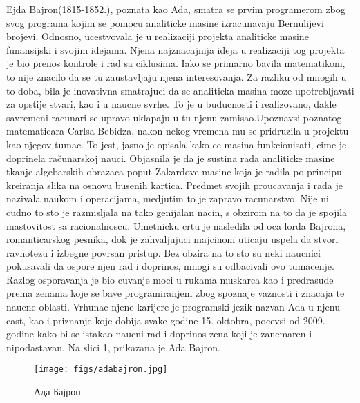 \documentclass[a4paper,12pt]{article}
\begin{document}
\begin{flushleft}
    Ejda Bajron(1815-1852.), poznata kao Ada, smatra se prvim programerom zbog svog programa kojim se pomocu analiticke masine izracunavaju Bernulijevi brojevi. Odnosno, ucestvovala je u realizaciji projekta analiticke masine funansijski i svojim idejama. Njena najznacajnija ideja u realizaciji tog projekta je bio prenos kontrole i rad sa ciklusima. Iako se primarno bavila matematikom, to nije znacilo da se tu zaustavljaju njena interesovanja. Za razliku od mnogih u to doba, bila je inovativna smatrajuci da se analiticka masina moze upotrebljavati za opstije stvari, kao i u naucne svrhe. To je u buducnosti i realizovano, dakle savremeni racunari se upravo uklapaju u tu njenu zamisao.Upoznavsi poznatog matematicara Carlsa Bebidza, nakon nekog vremena mu se pridruzila u projektu kao njegov tumac. To jest, jasno je opisala kako ce masina funkcionisati, cime je doprinela računarskoj nauci. Objasnila je da je sustina rada analiticke masine tkanje algebarskih obrazaca poput Zakardove masine koja je radila po principu kreiranja slika na osnovu busenih kartica. Predmet svojih proucavanja i rada je nazivala naukom i operacijama, medjutim to je zapravo racunarstvo. Nije ni cudno to sto je razmisljala na tako genijalan nacin, s obzirom na to da je spojila mastovitost sa racionalnoscu. Umetnicku crtu je nasledila od oca lorda Bajrona, romanticarskog pesnika, dok je zahvaljujuci majcinom uticaju uspela da stvori ravnotezu i izbegne povrsan pristup. Bez obzira na to sto su neki naucnici pokusavali da ospore njen rad i doprinos, mnogi su odbacivali ovo tumacenje. Razlog osporavanja je bio cuvanje moci u rukama muskarca kao i predrasude prema zenama koje se bave programiranjem zbog spoznaje vaznosti i znacaja te naucne oblasti. Vrhunac njene karijere je programski jezik nazvan Ada u njenu cast, kao i priznanje koje dobija svake godine 15. oktobra, pocevsi od 2009. godine kako bi se istakao naucni rad i doprinos zena koji je zanemaren i nipodastavan. Na slici 1, prikazana je Ada Bajron.
\end{flushleft}

\begin{figure}
    \centering
    \texttt{[image: figs/adabajron.jpg]}
    \caption{Ада Бајрон}
    \label{fig:my_label}
\end{figure}
\end{document}
